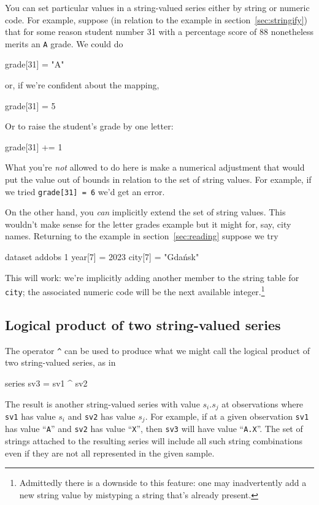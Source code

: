 You can set particular values in a string-valued series either by
string or numeric code. For example, suppose (in relation to the
example in section~\ref{sec:stringify}) that for some reason student
number 31 with a percentage score of 88 nonetheless merits an
\texttt{A} grade. We could do
\begin{code}
grade[31] = "A"
\end{code}
or, if we're confident about the mapping,
\begin{code}
grade[31] = 5
\end{code}
Or to raise the student's grade by one letter:
\begin{code}
grade[31] += 1
\end{code}

What you're \textit{not} allowed to do here is make a numerical
adjustment that would put the value out of bounds in relation to the
set of string values. For example, if we tried \texttt{grade[31] = 6}
we'd get an error.

On the other hand, you \textit{can} implicitly extend the set of
string values. This wouldn't make sense for the letter grades example
but it might for, say, city names. Returning to the example in
section~\ref{sec:reading} suppose we try
%
\begin{code}
dataset addobs 1
year[7] = 2023
city[7] = "Gdańsk"
\end{code}
%
This will work: we're implicitly adding another member to the string
table for \texttt{city}; the associated numeric code will be the next
available integer.\footnote{Admittedly there is a downside to this
  feature: one may inadvertently add a new string value by mistyping a
  string that's already present.}

\subsection{Logical product of two string-valued series}

The operator \verb|^| can be used to produce what we might call the
logical product of two string-valued series, as in
\begin{code}
series sv3 = sv1 ^ sv2
\end{code}
The result is another string-valued series with value $s_i.s_j$ at
observations where \texttt{sv1} has value $s_i$ and \texttt{sv2} has
value $s_j$. For example, if at a given observation \texttt{sv1} has
value ``\texttt{A}'' and \texttt{sv2} has value ``\texttt{X}'', then
\texttt{sv3} will have value ``\texttt{A.X}''. The set of strings
attached to the resulting series will include all such string
combinations even if they are not all represented in the given sample.

